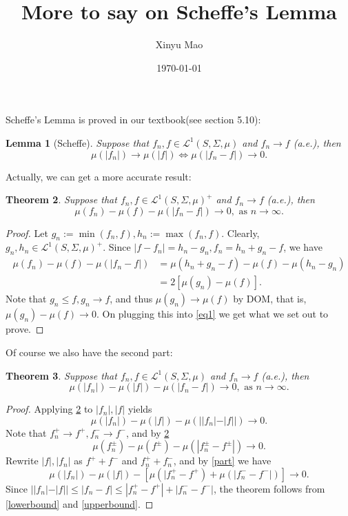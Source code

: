 \documentclass[12pt]{article}
\title{More to say on Scheffe's Lemma}
\author{Xinyu Mao}
\date{\today}
\theoremstyle{plain}
\newtheorem{theorem}{Theorem}
\newtheorem{lemma}[theorem]{Lemma}
\theoremstyle{definition}
\newcommand\LL{\mathcal{L}^1(S,\Sigma,\mu)}
\begin{document}
\maketitle
Scheffe's Lemma is proved in our textbook(see section 5.10):
\begin{lemma}[Scheffe] \label{scheffe}
    Suppose that $f_n, f \in \LL$ and $f_n \to f$ (a.e.), then
    $$
        \mu(|f_n|) \to \mu(|f|) \iff \mu(|f_n - f|) \to 0.
    $$
\end{lemma}

Actually, we can get a more accurate result:
\begin{theorem} \label{main}
    Suppose that $f_n, f \in \LL^+$ and $f_n \to f$ (a.e.), then
    $$
        \mu(f_n) - \mu(f) - \mu(|f_n - f|) \to 0, \text{ as $n \to \infty $}.
    $$
\end{theorem}
\begin{proof}
    Let $g_n := \min(f_n,f), h_n := \max(f_n,f)$. 
    Clearly, $g_n,h_n \in \LL^+$.
    Since $|f - f_n| = h_n - g_n, f_n = h_n + g_n - f$, we have
    \begin{equation} \label{eq1}
        \begin{aligned}
            \mu(f_n) - \mu(f) - \mu(|f_n - f|) 
            &=\mu(h_n + g_n - f) - \mu(f)  - \mu(h_n - g_n) \\
            &= 2[\mu(g_n) - \mu(f)].
        \end{aligned}
    \end{equation}
    Note that $g_n \leq f, g_n \to f$,  
    and thus $\mu(g_n) \to \mu(f)$ by DOM, that is, $\mu(g_n) - \mu(f) \to 0$.
    On plugging this into \cref{eq1} we get what we set out to prove.
\end{proof}

Of course we also have the second part:
\begin{theorem}
    Suppose that $f_n, f \in \LL$ and $f_n \to f$ (a.e.), then
    $$
        \mu(|f_n|) - \mu(|f|) - \mu(|f_n - f|) \to 0, \text{ as $n \to \infty $}.
    $$
\end{theorem}
\begin{proof}
    Applying \cref{main} to $|f_n|,|f|$ yields
    \begin{equation}\label{lowerbound}
        \mu(|f_n|) - \mu(|f|) - \mu(||f_n| - |f||) \to 0.
    \end{equation}
    Note that $f_n^+ \to f^+, f_n^- \to f^-$, and by \cref{main}
    \begin{equation} \label{part}
        \mu(f_n^\pm) - \mu(f^\pm) - \mu(|f_n^\pm - f^\pm|) \to 0.
    \end{equation}
    Rewrite $|f|, |f_n|$ as $f^+ + f^-$ and $f_n^+ + f_n^-$, and by \cref{part} we have 
    \begin{equation} \label{upperbound}
        \mu(|f_n|) - \mu(|f|) - [\mu(|f_n^+ - f^+) + \mu(|f_n^- - f^-|)] \to 0.
    \end{equation}
    Since $||f_n| - |f|| \leq |f_n - f| \leq |f_n^+ - f^+| + |f_n^- - f^-|$, 
    the theorem follows from \cref{lowerbound} and \cref{upperbound}.
\end{proof}
\end{document}
